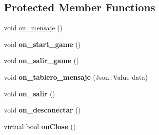 \subsection*{Protected Member Functions}
\begin{DoxyCompactItemize}
\item 
void \hyperlink{classGameWindow_ae8050c61cfb1a8e92b90e804ae52440f}{on\-\_\-mensaje} ()
\item 
\hypertarget{classGameWindow_ada57617f6a596aae2afabb6af2c4f8c5}{void {\bfseries on\-\_\-start\-\_\-game} ()}\label{classGameWindow_ada57617f6a596aae2afabb6af2c4f8c5}

\item 
\hypertarget{classGameWindow_a88f3f68a6d6b3ee5e9c70f17e7c354bf}{void {\bfseries on\-\_\-salir\-\_\-game} ()}\label{classGameWindow_a88f3f68a6d6b3ee5e9c70f17e7c354bf}

\item 
\hypertarget{classGameWindow_ae7f894b692d4473320e5fb8434a9b087}{void {\bfseries on\-\_\-tablero\-\_\-mensaje} (Json\-::\-Value data)}\label{classGameWindow_ae7f894b692d4473320e5fb8434a9b087}

\item 
\hypertarget{classGameWindow_af5db06b0e85117dff0c191b92693d82b}{void {\bfseries on\-\_\-salir} ()}\label{classGameWindow_af5db06b0e85117dff0c191b92693d82b}

\item 
\hypertarget{classGameWindow_a691183a64a0f14adaf29adb8124d81de}{void {\bfseries on\-\_\-desconectar} ()}\label{classGameWindow_a691183a64a0f14adaf29adb8124d81de}

\item 
\hypertarget{classGameWindow_a172ae0b0b00b7b6555772b9423895541}{virtual bool {\bfseries on\-Close} ()}\label{classGameWindow_a172ae0b0b00b7b6555772b9423895541}

\end{DoxyCompactItemize}
